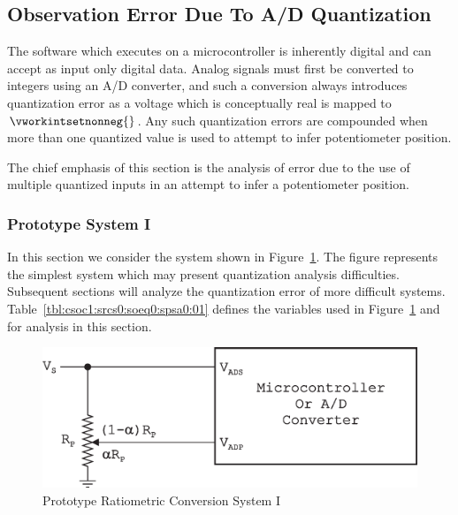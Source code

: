 \subsection{Observation Error Due To A/D Quantization}
\label{csoc1:srcs0:soeq0}

The software which executes on a microcontroller is inherently digital
and can accept as input only digital data.  Analog signals must first be
converted to integers using an A/D converter, and
such a conversion always introduces quantization
error as a voltage which is conceptually real is mapped to
$\vworkintsetnonneg{}$.  Any such quantization errors are compounded when
more than one quantized value is used to attempt to infer potentiometer 
position.

The chief emphasis of this section is the analysis of error due to the
use of multiple quantized inputs in an attempt to infer a potentiometer
position.


\subsubsection{Prototype System I}
\label{csoc1:srcs0:soeq0:spsa0}

In this section we consider the system shown in 
Figure~\ref{fig:csoc1:srcs0:soeq0:spsa0:01}.  
The figure represents
the simplest system which may present quantization
analysis difficulties.  Subsequent sections will analyze
the quantization error of more difficult systems.
Table~\ref{tbl:csoc1:srcs0:soeq0:spsa0:01} defines the
variables used in
Figure~\ref{fig:csoc1:srcs0:soeq0:spsa0:01} and for
analysis in this section.

\begin{figure}
\centering
\includegraphics[width=4.6in]{c_soc1/prcs001.eps}
\caption{Prototype Ratiometric Conversion System I}
\label{fig:csoc1:srcs0:soeq0:spsa0:01}
\end{figure}

